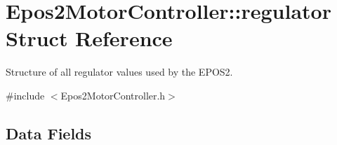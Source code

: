 \hypertarget{structEpos2MotorController_1_1regulator}{\section{Epos2\-Motor\-Controller\-:\-:regulator Struct Reference}
\label{structEpos2MotorController_1_1regulator}
}


Structure of all regulator values used by the E\-P\-O\-S2.  




{\ttfamily \#include $<$Epos2\-Motor\-Controller.\-h$>$}

\subsection*{Data Fields}
